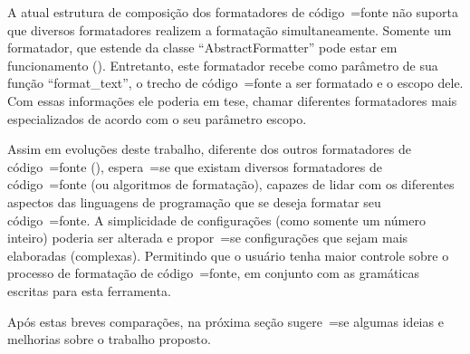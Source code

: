 A atual estrutura de composição dos formatadores de código~=fonte não suporta que diversos formatadores realizem a formatação simultaneamente.
Somente um formatador,
que estende da classe ``AbstractFormatter'' pode estar em funcionamento ().
Entretanto,
este formatador recebe como parâmetro de sua função ``format\_text'',
o trecho de código~=fonte a ser formatado e
o escopo dele.
Com essas informações ele poderia em tese,
chamar diferentes formatadores mais especializados de acordo com o seu parâmetro escopo.

Assim em evoluções deste trabalho,
diferente dos outros formatadores de código~=fonte (),
espera~=se que existam diversos formatadores de código~=fonte (ou algoritmos de formatação),
capazes de lidar com os diferentes aspectos das linguagens de programação que se deseja formatar seu código~=fonte.
A simplicidade de configurações (como somente um número inteiro) poderia ser alterada e
propor~=se configurações que sejam mais elaboradas (complexas).
Permitindo que o usuário tenha maior controle sobre o processo de formatação de código~=fonte,
em conjunto com as gramáticas escritas para esta ferramenta.

Após estas breves comparações,
na próxima seção sugere~=se algumas ideias e
melhorias sobre o trabalho proposto.


\section{}
\label{chapter:trabalhosFuturos}


